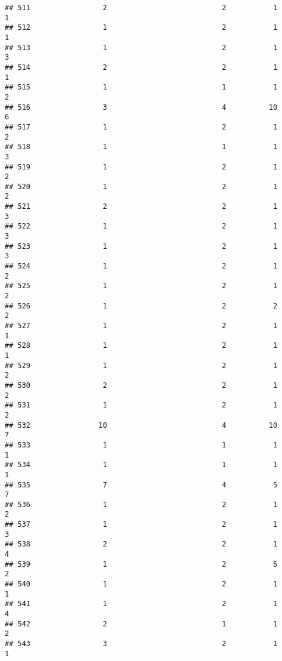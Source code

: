 \documentclass[
]{article}
\begin{document}
\begin{verbatim}
## 511                 2                           2           1               1
## 512                 1                           2           1               1
## 513                 1                           2           1               3
## 514                 2                           2           1               1
## 515                 1                           1           1               2
## 516                 3                           4          10               6
## 517                 1                           2           1               2
## 518                 1                           1           1               3
## 519                 1                           2           1               2
## 520                 1                           2           1               2
## 521                 2                           2           1               3
## 522                 1                           2           1               3
## 523                 1                           2           1               3
## 524                 1                           2           1               2
## 525                 1                           2           1               2
## 526                 1                           2           2               2
## 527                 1                           2           1               1
## 528                 1                           2           1               1
## 529                 1                           2           1               2
## 530                 2                           2           1               2
## 531                 1                           2           1               2
## 532                10                           4          10               7
## 533                 1                           1           1               1
## 534                 1                           1           1               1
## 535                 7                           4           5               7
## 536                 1                           2           1               2
## 537                 1                           2           1               3
## 538                 2                           2           1               4
## 539                 1                           2           5               2
## 540                 1                           2           1               1
## 541                 1                           2           1               4
## 542                 2                           1           1               2
## 543                 3                           2           1               1

\end{verbatim}
\end{document}

